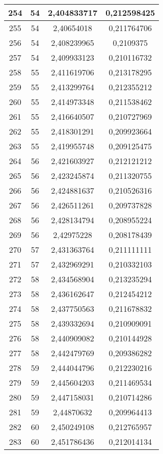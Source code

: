 {\begin{minipage}[!h]{0.45\textwidth}
\begin{longtable}{cccc}
254 & 54 & 2,404833717 & 0,212598425 \\ \hline
255 & 54 & 2,40654018 & 0,211764706 \\ \hline
256 & 54 & 2,408239965 & 0,2109375 \\ \hline
257 & 54 & 2,409933123 & 0,210116732 \\ \hline
258 & 55 & 2,411619706 & 0,213178295 \\ \hline
259 & 55 & 2,413299764 & 0,212355212 \\ \hline
260 & 55 & 2,414973348 & 0,211538462 \\ \hline
261 & 55 & 2,416640507 & 0,210727969 \\ \hline
262 & 55 & 2,418301291 & 0,209923664 \\ \hline
263 & 55 & 2,419955748 & 0,209125475 \\ \hline
264 & 56 & 2,421603927 & 0,212121212 \\ \hline
265 & 56 & 2,423245874 & 0,211320755 \\ \hline
266 & 56 & 2,424881637 & 0,210526316 \\ \hline
267 & 56 & 2,426511261 & 0,209737828 \\ \hline
268 & 56 & 2,428134794 & 0,208955224 \\ \hline
269 & 56 & 2,42975228 & 0,208178439 \\ \hline
270 & 57 & 2,431363764 & 0,211111111 \\ \hline
271 & 57 & 2,432969291 & 0,210332103 \\ \hline
272 & 58 & 2,434568904 & 0,213235294 \\ \hline
273 & 58 & 2,436162647 & 0,212454212 \\ \hline
274 & 58 & 2,437750563 & 0,211678832 \\ \hline
275 & 58 & 2,439332694 & 0,210909091 \\ \hline
276 & 58 & 2,440909082 & 0,210144928 \\ \hline
277 & 58 & 2,442479769 & 0,209386282 \\ \hline
278 & 59 & 2,444044796 & 0,212230216 \\ \hline
279 & 59 & 2,445604203 & 0,211469534 \\ \hline
280 & 59 & 2,447158031 & 0,210714286 \\ \hline
281 & 59 & 2,44870632 & 0,209964413 \\ \hline
282 & 60 & 2,450249108 & 0,212765957 \\ \hline
283 & 60 & 2,451786436 & 0,212014134 \\ \hline

\end{longtable}
\end{minipage}}
